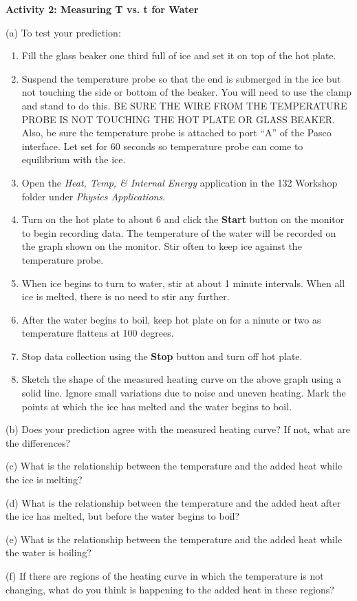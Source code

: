 \newpage

\textbf{Activity 2: Measuring T vs. t for Water} 

(a) To test your prediction: 

\begin{enumerate}
\item Fill the glass beaker one third full of ice and set it on top of the hot plate.
\item Suspend the temperature probe so that the end is submerged in the ice but not touching the side or bottom of the beaker. You will need to use the clamp and stand to do this. BE SURE THE WIRE FROM THE TEMPERATURE PROBE IS NOT TOUCHING THE HOT PLATE OR GLASS BEAKER. Also, be sure the temperature probe is attached to port ``A'' of the Pasco interface. Let set for 60 seconds so temperature probe can come to equilibrium with the ice.
\item Open the \textit{Heat, Temp, \& Internal Energy} application in the
132 Workshop folder under \textit{Physics Applications}.
\item Turn on the hot plate to about 6 and click the
\textbf{Start} button on the monitor to begin recording data. The temperature of the water will be recorded on the graph shown on the monitor. Stir often to keep ice against the temperature probe.
\item When ice begins to turn to water, stir at about 1 minute intervals. When all ice is melted, there is no need to stir any further.
\item After the water begins to boil, keep hot plate on for a ninute or two as temperature flattens at 100 degrees.
\item Stop data collection using the \textbf{Stop} button and turn off hot plate.
\item Sketch the shape of the measured heating curve on the above graph
using a solid line. Ignore small variations due to noise and uneven
heating. Mark the points at which the ice has melted and the water
begins to boil.
\end{enumerate}
(b) Does your prediction agree with the measured heating curve? If
not, what are the differences?
\vspace{15mm}

(c) What is the relationship between the temperature and the added
heat while the ice is melting?
\vspace{15mm}

(d) What is the relationship between the temperature and the added
heat after the ice has melted, but before the water begins to boil?
\vspace{15mm}

(e) What is the relationship between the temperature and the added
heat while the water is boiling?
\vspace{15mm}

(f) If there are regions of the heating curve in which the temperature
is not changing, what do you think is happening to the added heat
in these regions?\vspace{15mm}

